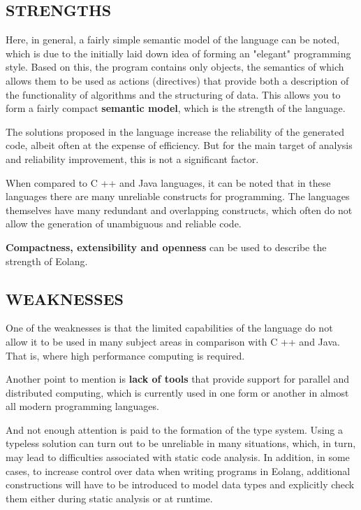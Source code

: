 \documentclass[12pt]{book}
\begin{document}
\subsection{STRENGTHS}
Here, in general, a fairly simple semantic model of the language can be noted, which is due to the initially laid down idea of forming an "elegant" programming style. Based on this, the program contains only objects, the semantics of which allows them to be used as actions (directives) that provide both a description of the functionality of algorithms and the structuring of data. This allows you to form a fairly compact \textbf{semantic model}, which is the strength of the language.

The solutions proposed in the language increase the reliability of the generated code, albeit often at the expense of efficiency. But for the main target of analysis and reliability improvement, this is not a significant factor.

When compared to C ++ and Java languages, it can be noted that in these languages there are many unreliable constructs for programming. The languages themselves have many redundant and overlapping constructs, which often do not allow the generation of unambiguous and reliable code.

\textbf{Compactness, extensibility and openness } can be used to describe the strength of Eolang.


\subsection{WEAKNESSES}
One of the weaknesses is that the limited capabilities of the language do not allow it to be used in many subject areas in comparison with C ++ and Java. That is, where high performance computing is required.

Another point to mention is \textbf{lack of tools} that provide support for parallel and distributed computing, which is currently used in one form or another in almost all modern programming languages.

And not enough attention is paid to the formation of the type system. Using a typeless solution can turn out to be unreliable in many situations, which, in turn, may lead to difficulties associated with static code analysis. In addition, in some cases, to increase control over data when writing programs in Eolang, additional constructions will have to be introduced to model data types and explicitly check them either during static analysis or at runtime.
\end{document}
